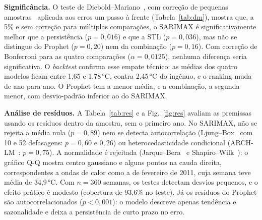 \documentclass[conference,a4paper]{IEEEtran}
\newcommand{\tabfont}{\footnotesize}
\begin{document}
\textbf{Significância.} O teste de Diebold--Mariano~\cite{diebold1995comparing}, com correção
de pequenas amostras~\cite{harvey1997testing} aplicada aos erros um passo à frente
(Tabela~\ref{tab:dm}), mostra que, a 5\% e sem correção para múltiplas comparações, o SARIMAX é
significativamente melhor que a persistência
($p=0{,}016$) e que a STL ($p=0{,}036$), mas não se distingue do Prophet ($p=0{,}20$) nem da
combinação ($p=0{,}16$). Com correção de Bonferroni para as quatro comparações ($\alpha=0{,}0125$),
nenhuma diferença seria significativa. O \textit{backtest} confirma esse empate técnico: as médias dos quatro
modelos ficam entre 1,65 e 1,78\,°C, contra 2,45\,°C do ingênuo, e o ranking muda de ano para
ano. O Prophet tem a menor média, e a combinação, a segunda menor, com desvio-padrão inferior ao
do SARIMAX.

\begin{table}[!t]
\centering
\caption{Teste de Diebold--Mariano: SARIMAX contra os demais modelos (erros um passo à frente). DM~$<0$ favorece o SARIMAX.}
\label{tab:dm}
\tabfont

\end{table}

\textbf{Análise de resíduos.} A Tabela~\ref{tab:res} e a Fig.~\ref{fig:res} avaliam as
premissas usando os resíduos dentro da amostra, sem o primeiro ano. No SARIMAX, não se rejeita a média nula
($p=0{,}89$) nem se detecta autocorrelação (Ljung--Box~\cite{ljung1978measure} com 10 e 52
defasagens: $p=0{,}60$ e $0{,}26$) ou heterocedasticidade condicional
(ARCH-LM~\cite{engle1982arch}: $p=0{,}75$). A normalidade é rejeitada
(Jarque--Bera~\cite{jarque1980efficient} e Shapiro--Wilk~\cite{shapiro1965analysis}): o gráfico Q-Q mostra centro gaussiano e alguns pontos na cauda direita,
correspondentes a ondas de calor como a de fevereiro de 2011, cuja semana teve média de
34,9\,°C. Com $n=360$ semanas, os testes detectam desvios pequenos, e o efeito prático é modesto
(cobertura de 93,6\% no teste). Já os resíduos do Prophet são autocorrelacionados ($p<0{,}001$):
o modelo descreve apenas tendência e sazonalidade e deixa a persistência de curto prazo no erro.

\begin{table}[!t]
\centering
\caption{Diagnóstico dos resíduos dentro da amostra (2009--2015): média e p-valores dos testes t (média nula), Ljung--Box com 10 e 52 defasagens (LB), Jarque--Bera (JB), Shapiro--Wilk (SW) e ARCH-LM com 10 defasagens.}
\label{tab:res}
\tabfont
\resizebox{\columnwidth}{!}{}
\end{table}
\end{document}
